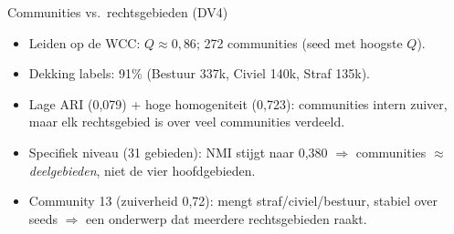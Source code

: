 \documentclass[aspectratio=169,11pt]{beamer}
\newcommand{\rd}[1]{\textcolor{uvared}{#1}}
\begin{document}
\begin{frame}{Communities vs.\ rechtsgebieden (DV4)}
  \footnotesize
  \begin{itemize}
    \item Leiden op de WCC: $Q\approx 0{,}86$; \rd{272 communities} (seed met hoogste $Q$).
    \item Dekking labels: 91\% (Bestuur 337k, Civiel 140k, Straf 135k).
    \item \rd{Lage ARI (0,079)} + \rd{hoge homogeniteit (0,723)}: communities intern zuiver, maar elk rechtsgebied is over veel communities verdeeld.
    \item Specifiek niveau (31 gebieden): NMI stijgt naar 0,380 $\Rightarrow$ communities $\approx$ \emph{deelgebieden}, niet de vier hoofdgebieden.
    \item Community 13 (zuiverheid 0,72): mengt straf/civiel/bestuur, stabiel over seeds $\Rightarrow$ een onderwerp dat meerdere rechtsgebieden raakt.
  \end{itemize}
\end{frame}
\end{document}
